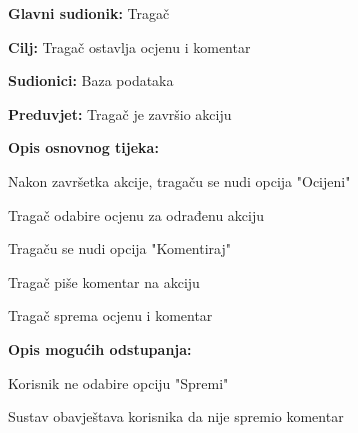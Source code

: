 				\noindent {}
				\begin{packed_item}
					
					\item \textbf{Glavni sudionik: }Tragač
					\item  \textbf{Cilj:} Tragač ostavlja ocjenu i komentar
					\item  \textbf{Sudionici:} Baza podataka
					\item  \textbf{Preduvjet:} Tragač je završio akciju
					\item  \textbf{Opis osnovnog tijeka:}
					
					\item[] \begin{packed_enum}
						
						\item Nakon završetka akcije, tragaču se nudi opcija "Ocijeni"
						\item Tragač odabire ocjenu za odrađenu akciju
						\item Tragaču se nudi opcija "Komentiraj"
						\item Tragač piše komentar na akciju
						\item Tragač sprema ocjenu i komentar
						
					\end{packed_enum}
					
						\item  \textbf{Opis mogućih odstupanja:}
					
					\item[] \begin{packed_item}
						
						\item[4.a]Korisnik ne odabire opciju "Spremi"
						\item[] \begin{packed_enum}
							
							\item Sustav obavještava korisnika da nije spremio komentar
							
						\end{packed_enum}
						
					\end{packed_item}
				\end{packed_item}
				
